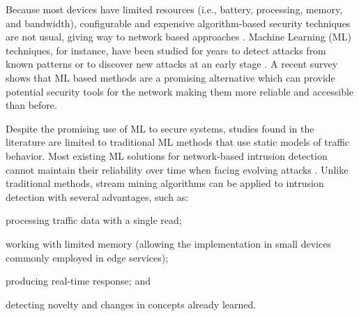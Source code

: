 Because most \iot devices have limited resources (i.e., battery, processing,
memory, and bandwidth), configurable and expensive algorithm-based
security techniques are not usual, giving way to network based approaches 
\cite{Zhou2017}.
Machine Learning (ML) techniques, for instance, have been studied for years to detect attacks
from known patterns or to discover new attacks at an early stage
\cite{buczak2016survey,mitchell2014survey}.
A recent survey \cite{Tahsien2020} shows that ML based methods are a
promising alternative which can provide potential security tools for the \iot
network making them more reliable and accessible than before.

Despite the promising use of ML to secure \iot systems, studies found in the
literature \cite{buczak2016survey,mitchell2014survey,Tahsien2020} are limited to
traditional ML methods that use static models of traffic behavior.
Most existing ML solutions for network-based intrusion detection cannot maintain
their reliability over time when facing evolving attacks \cite{Viegas2019}.
Unlike traditional methods, stream mining algorithms can be applied to intrusion
detection with several advantages, such as:
\begin{enumerate*}[label=(\emph{\roman*})]
    \item processing traffic data with a single read;
    \item working with limited memory (allowing the implementation in small
    devices commonly employed in edge services);
    \item producing real-time response; and
    \item detecting novelty and changes in concepts already learned.
\end{enumerate*}



